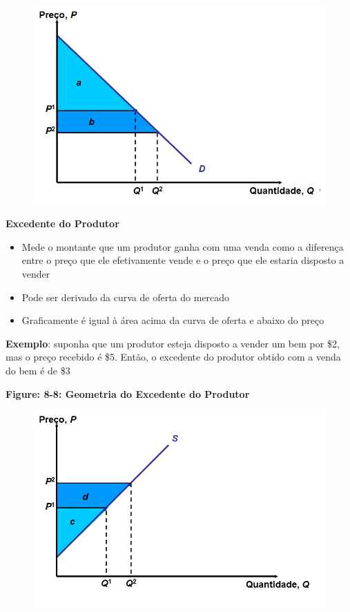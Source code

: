 \documentclass[a4paper,12pt]{article}[abntex2]
\begin{document}
\begin{figure}[H]
    \centering
    \includegraphics[width=0.7\linewidth]{Imagens/a20i3.png}
\end{figure}

\textbf{Excedente do Produtor}
\begin{itemize}
  \item Mede o montante que um produtor ganha com uma venda como a diferença entre o preço que ele efetivamente vende e o preço que ele estaria disposto a vender
  \item Pode ser derivado da curva de oferta do mercado
  \item Graficamente é igual à área acima da curva de oferta e abaixo do preço
\end{itemize}

\textbf{Exemplo}: suponha que um produtor esteja disposto a vender um bem por \$2, mas o preço recebido é \$5. Então, o excedente do produtor obtido com a venda do bem é de \$3

\textbf{Figure: 8-8: Geometria do Excedente do Produtor}

\begin{figure}[H]
    \centering
    \includegraphics[width=0.75\linewidth]{Imagens/a20i4.png}
\end{figure}
\end{document}
